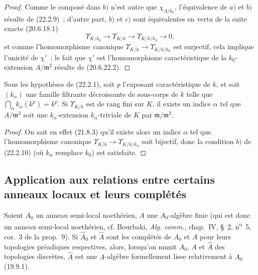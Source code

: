 \begin{proof}
Comme le composé dans $b)$ n'est autre que $\chi_{A/k_0}$, l'équivalence de
$a)$ et $b)$ résulte de (22.2.9)~; d'autre part, $b)$ et $c)$ sont
équivalentes en vertu de la suite exacte (20.6.18.1)
\[
  \Upsilon_{K/k_0}\longrightarrow\Upsilon_{K/k}
  \longrightarrow\Upsilon_{K/k/k_0}\longrightarrow0,
\]
et comme l'homomorphisme canonique
$\Upsilon_{K/k}\to\Upsilon_{K/k/k_0}$ est surjectif, cela implique l'unicité
de $\chi'$~; le fait que $\chi'$ est l'homomorphisme caractéristique de la
$k_0$-extension $A/\mathfrak m^2$ résulte de (20.6.22.2).
\end{proof}

\begin{corollary}[22.2.11]
\label{0.22.2.11-fr}
Sous les hypothèses de (22.2.1), soit $p$ l'exposant caractéristique de $k$,
et soit $(k_\alpha)$ une famille filtrante décroissante de sous-corps de $k$
telle que $\bigcap_\alpha k_\alpha(k^p)=k^p$. Si $\Upsilon_{K/k}$ est de rang
fini sur $K$, il existe un indice $\alpha$ tel que $A/\mathfrak m^2$ soit une
$k_\alpha$-extension $k_\alpha$-triviale de $K$ par
$\mathfrak m/\mathfrak m^2$.
\end{corollary}

\begin{proof}
On sait en effet (21.8.3) qu'il existe alors un indice $\alpha$ tel que
l'homomorphisme canonique
$\Upsilon_{K/k}\to\Upsilon_{K/k/k_\alpha}$ soit bijectif, donc la condition
$b)$ de (22.2.10) (où $k_\alpha$ remplace $k_0$) est satisfaite.
\end{proof}

\subsection{Application aux relations entre certains anneaux locaux et leurs complétés}
\label{subsection:0.22.3-fr}

\begin{lemma}[22.3.1]
\label{0.22.3.1-fr}
Soient $A_0$ un anneau semi-local noethérien, $A$ une $A_0$-algèbre finie
(qui est donc un anneau semi-local noethérien, cf. Bourbaki,
\emph{Alg. comm.}, chap.~IV, §~2, n\textsuperscript{o}~5, cor.~3 de la
prop.~9). Si $\widehat A_0$ et $\widehat A$ sont les complétés de $A_0$ et
$A$ pour leurs topologies préadiques respectives, alors, lorsqu'on munit
$A_0$, $A$ et $\widehat A$ des topologies discrètes, $\widehat A$ est une
$A$-algèbre formellement lisse relativement à $A_0$ (19.9.1).
\end{lemma}

